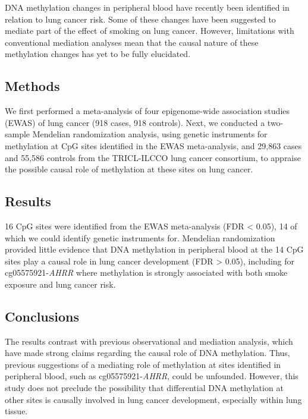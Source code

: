 \documentclass[11pt,twoside]{bristolthesis}
\begin{document}
DNA methylation changes in peripheral blood have recently been identified in relation to lung cancer risk. Some of these changes have been suggested to mediate part of the effect of smoking on lung cancer. However, limitations with conventional mediation analyses mean that the causal nature of these methylation changes has yet to be fully elucidated.

\hypertarget{methods-2}{%
\subsection{Methods}\label{methods-2}}

We first performed a meta-analysis of four epigenome-wide association studies (EWAS) of lung cancer (918 cases, 918 controls). Next, we conducted a two-sample Mendelian randomization analysis, using genetic instruments for methylation at CpG sites identified in the EWAS meta-analysis, and 29,863 cases and 55,586 controls from the TRICL-ILCCO lung cancer consortium, to appraise the possible causal role of methylation at these sites on lung cancer.

\hypertarget{results-1}{%
\subsection{Results}\label{results-1}}

16 CpG sites were identified from the EWAS meta-analysis (FDR \textless{} 0.05), 14 of which we could identify genetic instruments for. Mendelian randomization provided little evidence that DNA methylation in peripheral blood at the 14 CpG sites play a causal role in lung cancer development (FDR \textgreater{} 0.05), including for cg05575921-\emph{AHRR} where methylation is strongly associated with both smoke exposure and lung cancer risk.

\hypertarget{conclusions}{%
\subsection{Conclusions}\label{conclusions}}

The results contrast with previous observational and mediation analysis, which have made strong claims regarding the causal role of DNA methylation. Thus, previous suggestions of a mediating role of methylation at sites identified in peripheral blood, such as cg05575921-\emph{AHRR}, could be unfounded. However, this study does not preclude the possibility that differential DNA methylation at other sites is causally involved in lung cancer development, especially within lung tissue.
\end{document}
